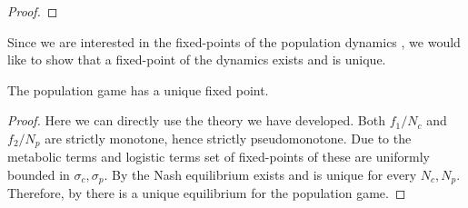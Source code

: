 \begin{proof}
\end{proof}
Since we are interested in the fixed-points of the population dynamics , we would like to show that a fixed-point of the dynamics exists and is unique.
\begin{corollary}
  The population game  has a unique fixed point.
\end{corollary}
\begin{proof}
Here we can directly use the theory we have developed.  Both $f_1/N_c$ and $f_2/N_p$ are strictly monotone, hence strictly pseudomonotone. Due to the metabolic terms and logistic terms set of fixed-points of these are uniformly bounded in $\sigma_c, \sigma_p$. By  the Nash equilibrium exists and is unique for every $N_c, N_p$. Therefore, by  there is a unique equilibrium for the population game.
\end{proof}
